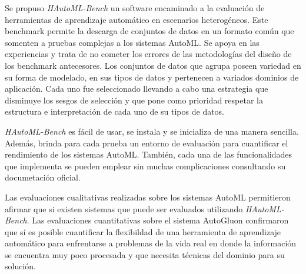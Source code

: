 \begin{conclusions}
Se propuso \textit{HAutoML-Bench} un software encaminado a la evaluación de herramientas de aprendizaje automático en escenarios heterogéneos.
Este benchmark permite la descarga de conjuntos de datos en un formato común que somenten a pruebas complejas a los sistemas AutoML. 
Se apoya en las experiencias y trata de no cometer los errores de las metodologías del diseño de los benchmark antecesores. Los conjuntos de datos que agrupa 
poseen variedad en su forma de modelado, en sus tipos de datos y pertenecen a variados dominios de aplicación. Cada uno fue seleccionado llevando a cabo una estrategia 
que disminuye los sesgos de selección y que pone como prioridad respetar la estructura e interpretación de cada uno de su tipos de datos.

\textit{HAutoML-Bench} es fácil de usar, se instala y se inicializa de una manera sencilla. Además, brinda para cada prueba un entorno de evaluación para cuantificar 
el rendimiento de los sistemas AutoML. También, cada una de las funcionalidades que implementa se pueden emplear sin muchas complicaciones consultando su documetación 
oficial.

Las evaluaciones cualitativas realizadas sobre los sistemas AutoML permitieron afirmar que si existen sistemas que puede ser evaluados utilizando \textit{HAutoML-Bench}.
Las evaluaciones cuantitativas sobre el sistema AutoGluon confirmaron que sí es posible cuantificar la flexibildad de una herramienta de aprendizaje automático para 
enfrentarse a problemas de la vida real en donde la información se encuentra muy poco procesada y que necesita técnicas del dominio para su solución.

\end{conclusions}
